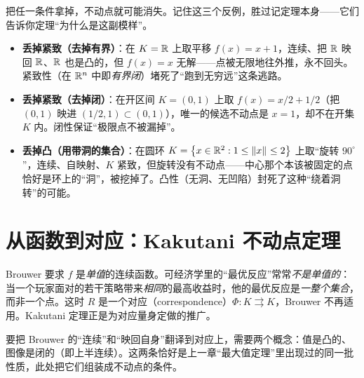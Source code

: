 把任一条件拿掉，不动点就可能消失。记住这三个反例，胜过记定理本身——它们告诉你定理``为什么是这副模样''。

\begin{itemize}
    \item \textbf{丢掉紧致（去掉有界）}：在 $K=\mathbb{R}$ 上取平移 $f(x)=x+1$，连续、把 $\mathbb{R}$ 映回 $\mathbb{R}$、$\mathbb{R}$ 也是凸的，但 $f(x)=x$ 无解——点被无限地往外推，永不回头。紧致性（在 $\mathbb{R}^n$ 中即\emph{有界闭}）堵死了``跑到无穷远''这条逃路。
    \item \textbf{丢掉紧致（去掉闭）}：在开区间 $K=(0,1)$ 上取 $f(x)=x/2+1/2$（把 $(0,1)$ 映进 $(1/2,1)\subset(0,1)$），唯一的候选不动点是 $x=1$，却不在开集 $K$ 内。闭性保证``极限点不被漏掉''。
    \item \textbf{丢掉凸（用带洞的集合）}：在圆环 $K=\left\{x\in\mathbb{R}^2:1\le\left\|x\right\|_{}\le 2\right\}$ 上取``旋转 $90^\circ$''，连续、自映射、$K$ 紧致，但旋转没有不动点——中心那个本该被固定的点恰好是环上的``洞''，被挖掉了。凸性（无洞、无凹陷）封死了这种``绕着洞转''的可能。
\end{itemize}


\section{从函数到对应：Kakutani 不动点定理}
\label{sec:fixedpt-kakutani}

Brouwer 要求 $f$ 是\emph{单值}的连续函数。可经济学里的``最优反应''常常\emph{不是单值的}：当一个玩家面对的若干策略带来\emph{相同}的最高收益时，他的最优反应是\emph{一整个集合}，而非一个点。这时 $R$ 是一个对应（correspondence）$\Phi:K\rightrightarrows K$，Brouwer 不再适用。Kakutani 定理正是为对应量身定做的推广。

要把 Brouwer 的``连续''和``映回自身''翻译到对应上，需要两个概念：值是凸的、图像是闭的（即上半连续）。这两条恰好是上一章``最大值定理''里出现过的同一批性质，此处把它们组装成不动点的条件。


